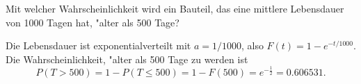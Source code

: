 Mit welcher Wahrscheinlichkeit wird ein Bauteil, das eine mittlere Lebensdauer
von 1000 Tagen hat, "alter als 500 Tage?

\begin{loesung}
Die Lebensdauer ist exponentialverteilt mit $a=1/1000$, also
$F(t)=1-e^{-t/1000}$. Die Wahrscheinlichkeit, "alter als 500 Tage
zu werden ist
\[
P(T > 500)=1-P(T\le 500)=1-F(500)=e^{-\frac12}=0.606531.
\]
\end{loesung}

